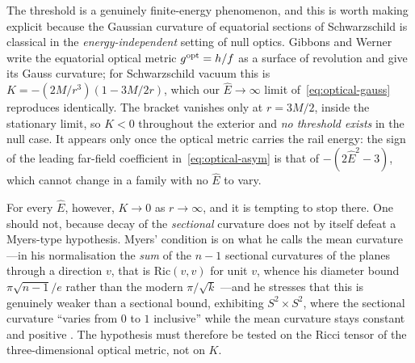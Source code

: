 \documentclass[12pt]{iopart}
\theoremstyle{plain}
\theoremstyle{definition}
\theoremstyle{remark}
\newcommand{\Ehat}{\hat E}
\begin{document}
The threshold is a genuinely finite-energy phenomenon, and this is worth making
explicit because the Gaussian curvature of equatorial sections of Schwarzschild is
classical in the \emph{energy-independent} setting of null optics. Gibbons and
Werner \cite[Eqs.~(7)--(8)]{GibbonsWerner2008} write the equatorial optical
metric $g^{\rm opt}=h/f$ as a surface of revolution and give its Gauss curvature;
for Schwarzschild vacuum this is $K=-(2M/r^3)(1-3M/2r)$, which our
$\Ehat\to\infty$ limit of~\eqref{eq:optical-gauss} reproduces identically. The
bracket vanishes only at $r=3M/2$, inside the stationary limit, so $K<0$
throughout the exterior and \emph{no threshold exists} in the null case. It appears only once the optical metric carries the rail
energy: the sign of the leading far-field coefficient
in~\eqref{eq:optical-asym} is that of $-(2\Ehat^2-3)$, which cannot change in a
family with no $\Ehat$ to vary.

For every $\Ehat$, however, $K\to0$ as $r\to\infty$, and it is tempting to stop
there. One should not, because decay of the \emph{sectional} curvature does not by
itself defeat a Myers-type hypothesis. Myers' condition is on what he calls the
mean curvature---in his normalisation the \emph{sum} of the $n-1$ sectional
curvatures of the planes through a direction $v$, that is $\mathrm{Ric}(v,v)$ for
unit $v$, whence his diameter bound $\pi\sqrt{n-1}/e$ rather than the modern
$\pi/\sqrt k$ \cite[footnotes 3--4]{Myers1941}---and he stresses that this is
genuinely weaker than a sectional bound, exhibiting $S^2\times S^2$, where the
sectional curvature ``varies from $0$ to $1$ inclusive'' while the mean curvature
stays constant and positive \cite[\S4]{Myers1941}. The hypothesis must therefore be
tested on the Ricci tensor of the three-dimensional optical metric, not on $K$.
\end{document}
